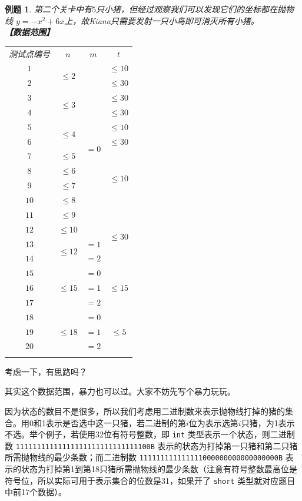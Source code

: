 \documentclass{article}
\newcommand{\mr}[2]{\multirow{#1}{*}{#2}}
\newtheorem{example}{例题}[subsection]
\theoremstyle{nonumberplain}
\begin{document}
\begin{example}
第二个关卡中有$5$只小猪，但经过观察我们可以发现它们的坐标都在抛物线 $y = -x^2 + 6x$上，故Kiana只需要发射一只小鸟即可消灭所有小猪。
\ \\
\textbf{【数据范围】}
\begin{center}
\begin{tabular}{c|c|c|c}
\Xhline{1.2pt}
测试点编号&$n$&$m$&$t$\\
\Xhline{1.2pt}
$1$&\multirow{2}{*}{$\leq 2$}&\multirow{12}{*}{$=0$}&$\leq 10$\\
\cline{1-1}\cline{4-4}
$2$&&&$\leq 30$\\
\cline{1-2}\cline{4-4}
$3$&\mr{2}{$\leq 3$}&&$\leq 30$\\
\cline{1-1}\cline{4-4}
$4$&&&$\leq 30$\\
\cline{1-2}\cline{4-4}
$5$&\mr{2}{$\leq 4$}&&$\leq 10$\\
\cline{1-1}\cline{4-4}
$6$&&&$\leq 30$\\
\cline{1-2}\cline{4-4}
$7$&$\leq 5$&&\mr{4}{$\leq 10$}\\
\cline{1-2}
$8$&$\leq 6$&&\\
\cline{1-2}
$9$&$\leq 7$&&\\
\cline{1-2}
$10$&$\leq 8$&&\\
\cline{1-2}\cline{4-4}
$11$&$\leq 9$&&\mr{4}{$\leq 30$}\\
\cline{1-2}
$12$&$\leq 10$&&\\
\cline{1-3}
$13$&\mr{2}{$\leq 12$}&$=1$&\\
\cline{1-1}\cline{3-3}
$14$&&$=2$&\\
\cline{1-4}
$15$&\mr{3}{$\leq 15$}&$=0$&\mr{3}{$\leq 15$}\\
\cline{1-1}\cline{3-3}
$16$&&$=1$&\\
\cline{1-1}\cline{3-3}
$17$&&$=2$&\\
\cline{1-4}
$18$&\mr{3}{$\leq 18$}&$=0$&\mr{3}{$\leq 5$}\\
\cline{1-1}\cline{3-3}
$19$&&$=1$&\\
\cline{1-1}\cline{3-3}
$20$&&$=2$&\\
\Xhline{1.2pt}
\end{tabular}
\end{center}
\end{example}

考虑一下，有思路吗？

其实这个数据范围，暴力也可以过。大家不妨先写个暴力玩玩。

因为状态的数目不是很多，所以我们考虑用二进制数来表示抛物线打掉的猪的集合。用0和1表示是否选中这一只猪，若二进制的第$i$位为表示选第$i$只猪，为1表示不选。举个例子，若使用32位有符号整数，即 \verb+int+ 类型表示一个状态，则二进制数 \verb+11111111111111111111111111111100B+ 表示的状态为打掉第一只猪和第二只猪所需抛物线的最少条数；而二进制数 \verb+111111111111111000000000000000000B+ 表示的状态为打掉第1到第18只猪所需抛物线的最少条数（注意有符号整数最高位是符号位，所以实际可用于表示集合的位数是31，如果开了 \verb+short+ 类型就对应题目中前17个数据）。
\end{document}
